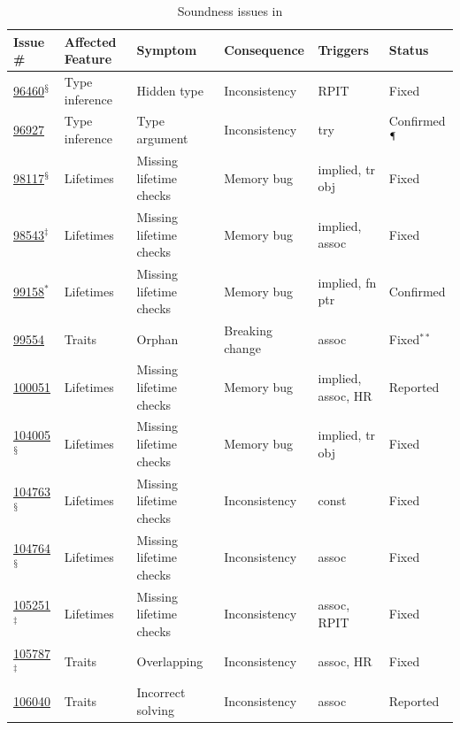 \begin{table}[t]
\caption{Soundness issues in \rustc{}}
\label{tab:issues}
  \renewcommand{\arraystretch}{0.9}
  \vspace{-1.0em}
  {  \scriptsize
\begin{tabular}{l|l|l|l|l|l}
Issue \# & Affected Feature & Symptom & Consequence & Triggers & Status \\ \hline
\href{https://github.com/rust-lang/rust/issues/96460}{96460}$^\mathsection$& Type inference & Hidden type & Inconsistency & RPIT & Fixed \\
\href{https://github.com/rust-lang/rust/issues/96927}{96927}&Type inference&Type argument&Inconsistency&try&Confirmed$^\mathparagraph$\\
\href{https://github.com/rust-lang/rust/issues/98117}{98117}$^\mathsection$& Lifetimes & Missing lifetime checks & Memory bug & implied, tr obj & Fixed \\
\href{https://github.com/rust-lang/rust/issues/98543}{98543}$^\ddag$&Lifetimes&Missing lifetime checks&Memory bug&implied, assoc&Fixed\\
\href{https://github.com/rust-lang/rust/issues/99158}{99158}$^\ast$&Lifetimes&Missing lifetime checks&Memory bug&implied, fn ptr&Confirmed\\
\href{https://github.com/rust-lang/rust/issues/99554}{99554}&Traits&Orphan&Breaking
change&assoc&Fixed$^{\ast\ast}$\\
\href{https://github.com/rust-lang/rust/issues/100051}{100051}&Lifetimes&Missing lifetime checks&Memory bug&implied, assoc, HR&Reported\\
\href{https://github.com/rust-lang/rust/issues/104005}{104005}$^\mathsection$& Lifetimes & Missing lifetime checks & Memory bug & implied, tr obj & Fixed \\
\href{https://github.com/rust-lang/rust/issues/104763}{104763}$^\mathsection$& Lifetimes & Missing lifetime checks & Inconsistency & const & Fixed \\
\href{https://github.com/rust-lang/rust/issues/104764}{104764}$^\mathsection$& Lifetimes & Missing lifetime checks & Inconsistency & assoc & Fixed \\
\href{https://github.com/rust-lang/rust/issues/105251}{105251}$^\ddag$&Lifetimes&Missing lifetime checks&Inconsistency&assoc, RPIT&Fixed\\
\href{https://github.com/rust-lang/rust/issues/105787}{105787}$^\ddag$&Traits&Overlapping&Inconsistency&assoc, HR&Fixed\\
\href{https://github.com/rust-lang/rust/issues/106040}{106040}&Traits&Incorrect solving&Inconsistency&assoc&Reported\\

\end{tabular}}
\end{table}
